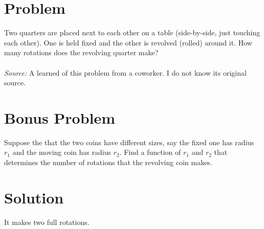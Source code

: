 \documentclass[11pt,a4paper]{report}
\theoremstyle{plain}
\theoremstyle{definition}
\theoremstyle{remark}
\begin{document}
\section*{Problem}
Two quarters are placed next to each other on a table (side-by-side, just touching each other).  One is held fixed and the other is revolved (rolled) around it.  How many rotations does the revolving quarter make?  
\\
\\
\textit{Source:} A learned of this problem from a coworker. I do not know its original source.

\section*{Bonus Problem}
 Suppose the that the two coins have different sizes, say the fixed one has radius $r_1$ and the moving coin has radius $r_2$.  Find a function of $r_1$ and $r_2$ that determines the number of rotations that the revolving coin makes.

\section*{Solution}
It makes two full rotations. 
\end{document}
